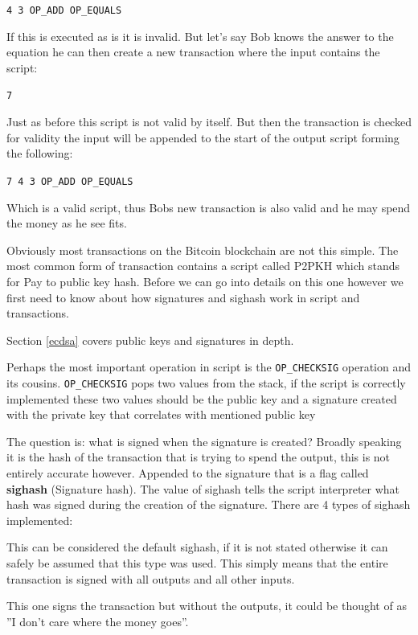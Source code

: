 \texttt{4 3 OP\_ADD OP\_EQUALS}

If this is executed as is it is invalid. But let's say Bob knows the answer to the equation he can then create a new transaction where the input contains the script: 

\texttt{7} 

Just as before this script is not valid by itself. But then the transaction is checked for validity the input will be appended to the start of the output script forming the following: 

\texttt{7 4 3 OP\_ADD OP\_EQUALS}

Which is a valid script, thus Bobs new transaction is also valid and he may spend the money as he see fits. 

Obviously most transactions on the Bitcoin blockchain are not this simple. The most common form of transaction contains a script called P2PKH which stands for Pay to public key hash. Before we can go into details on this one however we first need to know about how signatures and sighash work in script and transactions.

Section \ref{ecdsa} covers public keys and signatures in depth.

Perhaps the most important operation in script is the \texttt{OP\_CHECKSIG} operation and its cousins. \texttt{OP\_CHECKSIG} pops two values from the stack, if the script is correctly implemented these two values should be the public key and a signature created with the private key that correlates with mentioned public key

The question is: what is signed when the signature is created? Broadly speaking it is the hash of the transaction that is trying to spend the output, this is not entirely accurate however.\cite{antonopoulos_2017} Appended to the signature that is a flag called \textbf{sighash} (Signature hash). The value of sighash tells the script interpreter what hash was signed during the creation of the signature.\cite{bitcoin_core_sighash} There are 4 types of sighash implemented:

This can be considered the default sighash, if it is not stated otherwise it can safely be assumed that this type was used. This simply means that the entire transaction is signed with all outputs and all other inputs.

This one signs the transaction but without the outputs, it could be thought of as ''I don't care where the money goes''.


